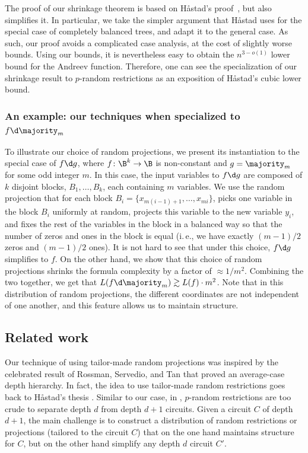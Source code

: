 \documentclass[11pt]{article}
\numberwithin{equation}{section}
\theoremstyle{definition}
\theoremstyle{plain}
\newcommand{\ie}{i.\,e.}
\theoremstyle{definition}\newtheorem{notation}[theorem]{Notation}\theoremstyle{plain}
\begin{document}
The proof of our shrinkage theorem is based on H{\aa}stad's proof~\cite{H98},
but also simplifies it. In particular, we take the simpler argument
that H{\aa}stad uses for the special case of completely balanced
trees, and adapt it to the general case. As such, our proof avoids
a complicated case analysis, at the cost of slightly worse bounds.
Using our bounds, it is nevertheless easy to obtain the $n^{3-o(1)}$
lower bound for the Andreev function. Therefore, one can see the specialization
of our shrinkage result to $p$-random restrictions as an exposition
of H{\aa}stad's cubic lower bound.

%
\subsubsection{An example: our techniques when specialized to $f\protect\d\protect\majority_{m}$}   %

To illustrate our choice of random projections, we present its instantiation
to the special case of $f\d g$, where $f\colon\B^{k}\to\B$ is non-constant
and $g=\majority_{m}$ for some odd integer $m$. In this case, the
input variables to $f\d g$ are composed of $k$ disjoint blocks,
$B_{1},\ldots,B_{k}$, each containing $m$ variables. We use the
random projection that for each block $B_{i}=\{x_{m(i-1)+1},\ldots,x_{mi}\}$,
picks one variable in the block $B_{i}$ uniformly at random, projects
this variable to the new variable $y_{i}$, and fixes the rest of
the variables in the block in a balanced way so that the number of
zeros and ones in the block is equal (\ie, we have exactly $(m-1)/2$
zeros and $(m-1)/2$ ones). It is not hard to see that under this
choice, $f\d g$ simplifies to $f$. On the other hand, we show that
this choice of random projections shrinks the formula complexity by
a factor of $\approx1/m^{2}$. Combining the two together, we get
that $L(f\d\majority_{m})\gtrsim L(f)\cdot m^{2}$. Note that in this
distribution of random projections, the different coordinates are
not independent of one another, and this feature allows us to maintain
structure.

\subsection{Related work}

Our technique of using tailor-made random projections was inspired
by the celebrated result of Rossman, Servedio, and Tan
%
\cite{HRST17}   %
that proved an average-case depth hierarchy. In fact, the idea to
use tailor-made random restrictions goes back to H{\aa}stad's thesis
\cite[Chapter~6.2]{H87}. Similar to our case, in
%
\cite{H87,HRST17},  %
$p$-random restrictions are too crude to separate depth $d$ from
depth $d+1$ circuits. Given a circuit $C$ of depth $d+1$, the main
challenge is to construct a distribution of random restrictions or
projections (tailored to the circuit $C$) that on the one hand maintains
structure for $C$, but on the other hand simplify any depth $d$
circuit $C'$.
\end{document}
